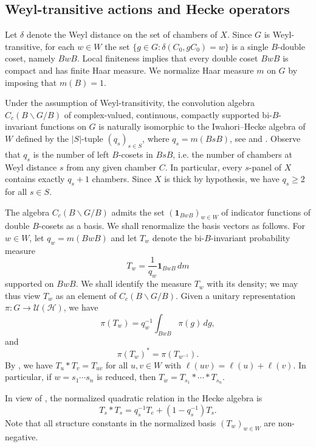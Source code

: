 \documentclass[12pt,a4paper]{amsproc}
\theoremstyle{definition}
\newcommand{\cH}{\mathcal H}
\newcommand{\cU}{\mathcal U}
\begin{document}
\subsection{Weyl-transitive actions and Hecke operators}
\label{sec:hecke-preliminaries}


Let $\delta$ denote the Weyl distance on the set of chambers of $X$. Since $G$ is Weyl-transitive, for each $w\in W$ the set $\{g\in G:\delta(C_0,gC_0)=w\}$ is a single $B$-double coset, namely $BwB$. Local finiteness implies that every double coset $BwB$ is compact and has finite Haar measure. We normalize Haar measure $m$ on $G$ by imposing that $m(B)=1$. 

Under the assumption of Weyl-transitivity, the convolution algebra $C_c(B\backslash G/B)$ of complex-valued, continuous, compactly supported bi-$B$-invariant functions on $G$ is naturally isomorphic to the Iwahori--Hecke algebra of $W$ defined by the $|S|$-tuple $(q_s)_{s \in S}$, where $q_s=m(BsB)$, see \cite[\S19.1]{Davis} and \cite[CH.~IV, Exer.~23]{Bour}. Observe that $q_s$ is the number of left $B$-cosets in $BsB$, i.e. the number of chambers at Weyl distance $s$ from any given chamber $C$. In particular, every $s$-panel of $X$ contains exactly $q_s+1$  chambers. Since $X$ is thick by hypothesis, we have $q_s\geq2$ for all $s \in S$. 

The algebra $C_c(B\backslash G/B)$ admits  the set $(\mathbf 1_{BwB})_{ w \in W}$ of indicator functions of double $B$-cosets as a basis. We shall renormalize the basis vectors as follows. For $w\in W$, let $q_w=m(BwB)$ and let $T_w$ denote the  bi-$B$-invariant probability measure 
$$T_w=\frac 1 {q_w}\mathbf 1_{BwB}\,dm$$ 
supported on $BwB$. We shall identify the measure $T_w$ with its density; we may thus view $T_w$ as an element of $C_c(B\backslash G/B)$. 
Given  a unitary representation $\pi \colon G\to\cU(\cH)$, we have 
$$\pi(T_w)=q_w^{-1}\int_{BwB}\pi(g)\,dg,$$ and
$$\pi(T_w)^*=\pi(T_{w^{-1}}).$$ 
By \cite[Lemma~19.1.2]{Davis}, we have  $T_u*T_v=T_{uv}$ for all $u, v \in W$ with  $\ell(uv)=\ell(u)+\ell(v)$. In particular, if $w=s_1\cdots s_n$ is reduced, then $T_w=T_{s_1}*\cdots*T_{s_n}$.

In view of \cite[Proposition~19.1.1 and Lemma~19.1.5]{Davis}, the normalized quadratic relation in the Hecke algebra is
\begin{equation}\label{eq:quadratic}
        T_s*T_s=q_s^{-1}T_e+(1-q_s^{-1})T_s.
\end{equation}
Note that all structure constants in the normalized basis $(T_w)_{w\in W}$ are non-negative.
\end{document}
